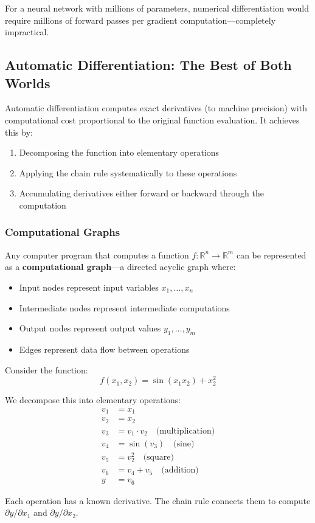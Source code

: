 For a neural network with millions of parameters, numerical differentiation would require millions of forward passes per gradient computation---completely impractical.

\subsection{Automatic Differentiation: The Best of Both Worlds}

Automatic differentiation computes exact derivatives (to machine precision) with computational cost proportional to the original function evaluation. It achieves this by:

\begin{enumerate}
    \item Decomposing the function into elementary operations
    \item Applying the chain rule systematically to these operations
    \item Accumulating derivatives either forward or backward through the computation
\end{enumerate}

\subsubsection{Computational Graphs}

Any computer program that computes a function $f: \mathbb{R}^n \to \mathbb{R}^m$ can be represented as a \textbf{computational graph}---a directed acyclic graph where:

\begin{itemize}
    \item Input nodes represent input variables $x_1, \ldots, x_n$
    \item Intermediate nodes represent intermediate computations
    \item Output nodes represent output values $y_1, \ldots, y_m$
    \item Edges represent data flow between operations
\end{itemize}

\begin{example}
\label{ex:comp_graph}
Consider the function:
\begin{equation}
f(x_1, x_2) = \sin(x_1 x_2) + x_2^2
\end{equation}

We decompose this into elementary operations:
\begin{align}
v_1 &= x_1 \\
v_2 &= x_2 \\
v_3 &= v_1 \cdot v_2 \quad \text{(multiplication)} \\
v_4 &= \sin(v_3) \quad \text{(sine)} \\
v_5 &= v_2^2 \quad \text{(square)} \\
v_6 &= v_4 + v_5 \quad \text{(addition)} \\
y &= v_6
\end{align}

Each operation has a known derivative. The chain rule connects them to compute $\partial y / \partial x_1$ and $\partial y / \partial x_2$.
\end{example}

